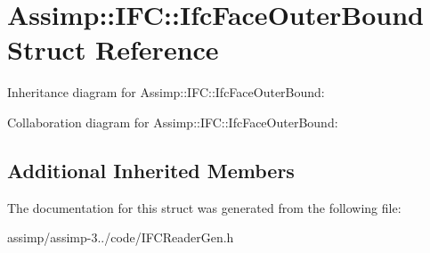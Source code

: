 \hypertarget{struct_assimp_1_1_i_f_c_1_1_ifc_face_outer_bound}{\section{Assimp\+:\+:I\+F\+C\+:\+:Ifc\+Face\+Outer\+Bound Struct Reference}
\label{struct_assimp_1_1_i_f_c_1_1_ifc_face_outer_bound}
}


Inheritance diagram for Assimp\+:\+:I\+F\+C\+:\+:Ifc\+Face\+Outer\+Bound\+:


Collaboration diagram for Assimp\+:\+:I\+F\+C\+:\+:Ifc\+Face\+Outer\+Bound\+:
\subsection*{Additional Inherited Members}


The documentation for this struct was generated from the following file\+:\begin{DoxyCompactItemize}
\item 
assimp/assimp-\/3../code/I\+F\+C\+Reader\+Gen.\+h\end{DoxyCompactItemize}
